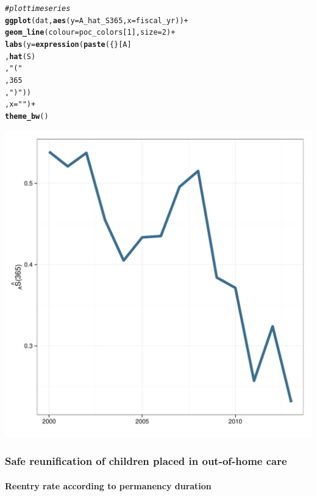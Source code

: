 \documentclass[12pt]{article}\usepackage[]{graphicx}\usepackage[]{color}
\makeatletter
\def\maxwidth{ %
  \ifdim\Gin@nat@width>\linewidth
    \linewidth
  \else
    \Gin@nat@width
  \fi
}
\newcommand{\hlnum}[1]{\textcolor[rgb]{0.686,0.059,0.569}{#1}}%
\newcommand{\hlstr}[1]{\textcolor[rgb]{0.192,0.494,0.8}{#1}}%
\newcommand{\hlcom}[1]{\textcolor[rgb]{0.678,0.584,0.686}{\textit{#1}}}%
\newcommand{\hlopt}[1]{\textcolor[rgb]{0,0,0}{#1}}%
\newcommand{\hlstd}[1]{\textcolor[rgb]{0.345,0.345,0.345}{#1}}%
\newcommand{\hlkwc}[1]{\textcolor[rgb]{0.333,0.667,0.333}{#1}}%
\newcommand{\hlkwd}[1]{\textcolor[rgb]{0.737,0.353,0.396}{\textbf{#1}}}%
\newenvironment{kframe}{%
 \def\at@end@of@kframe{}%
 \ifinner\ifhmode%
  \def\at@end@of@kframe{\end{minipage}}%
  \begin{minipage}{\columnwidth}%
 \fi\fi%
 \def\FrameCommand##1{\hskip\@totalleftmargin \hskip-\fboxsep
 \colorbox{shadecolor}{##1}\hskip-\fboxsep
     \hskip-\linewidth \hskip-\@totalleftmargin \hskip\columnwidth}%
 \MakeFramed {\advance\hsize-\width
   \@totalleftmargin\z@ \linewidth\hsize
   \@setminipage}}%
 {\par\unskip\endMakeFramed%
 \at@end@of@kframe}
\newenvironment{knitrout}{}{} %
\makeatother
\begin{document}
\begin{knitrout}
\begin{kframe}
\begin{alltt}
\hlcom{#plot time series}
\hlkwd{ggplot}\hlstd{(dat,} \hlkwd{aes}\hlstd{(}\hlkwc{y}\hlstd{=A_hat_S365,} \hlkwc{x}\hlstd{=fiscal_yr))} \hlopt{+}
  \hlkwd{geom_line}\hlstd{(}\hlkwc{colour}\hlstd{=poc_colors[}\hlnum{1}\hlstd{],} \hlkwc{size}\hlstd{=}\hlnum{2}\hlstd{)} \hlopt{+}
  \hlkwd{labs}\hlstd{(}\hlkwc{y} \hlstd{=} \hlkwd{expression}\hlstd{(}\hlkwd{paste}\hlstd{(\{\}[A]}
                            \hlstd{,}\hlkwd{hat}\hlstd{(S)}
                            \hlstd{,}\hlstr{"("}
                            \hlstd{,}\hlnum{365}
                            \hlstd{,}\hlstr{")"}\hlstd{))}
       \hlstd{,}\hlkwc{x} \hlstd{=} \hlstr{""}\hlstd{)} \hlopt{+}
  \hlkwd{theme_bw}\hlstd{()}
\end{alltt}
\end{kframe}
\includegraphics[width=\maxwidth]{figure/A_hat_S} 

\end{knitrout}





\subsubsection{Safe reunification of children placed in out-of-home care}
 
\paragraph{Reentry rate according to permanency duration}
 
\end{document}
